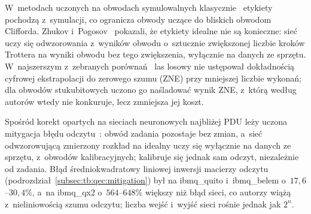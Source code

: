 W~metodach uczonych na obwodach symulowalnych klasycznie~\cite{czarnik_error_2021,strikis_learning-based_2021} etykiety pochodzą z~symulacji, co ogranicza obwody uczące do bliskich obwodom Clifforda.
Zhukov i~Pogosov~\cite{zhukov_quantum_2022} pokazali, że etykiety idealne nie są konieczne: sieć uczy się odwzorowania z~wyników obwodu o~sztucznie zwiększonej liczbie kroków Trottera na wyniki obwodu bez tego zwiększenia, wyłącznie na danych ze sprzętu.
W~najszerszym z~zebranych porównań~\cite{liao_machine_2024} las losowy nie ustępował dokładnością cyfrowej ekstrapolacji do zerowego szumu (ZNE) przy mniejszej liczbie wykonań; dla obwodów stukubitowych uczono go naśladować wynik ZNE, z~którą według autorów wtedy nie konkuruje, lecz zmniejsza jej koszt.

Spośród korekt opartych na sieciach neuronowych najbliżej PDU leży uczona mitygacja błędu odczytu~\cite{kim_quantum_2022}: obwód zadania pozostaje bez zmian, a~sieć odwzorowującą zmierzony rozkład na idealny uczy się wyłącznie na danych ze sprzętu, z~obwodów kalibracyjnych; kalibruje się jednak sam odczyt, niezależnie od zadania.
Błąd średniokwadratowy liniowej inwersji macierzy odczytu (podrozdział~\ref{subsec:tb:qec:mitigation}) był na ibmq\_quito i~ibmq\_belem o~$17{,}6$--$30{,}4\%$, a~na ibmq\_qx2 o~$564$--$648\%$ większy niż błąd sieci, co autorzy wiążą z~nieliniowością szumu odczytu; liczba wejść i~wyjść sieci rośnie jednak jak $2^n$.

